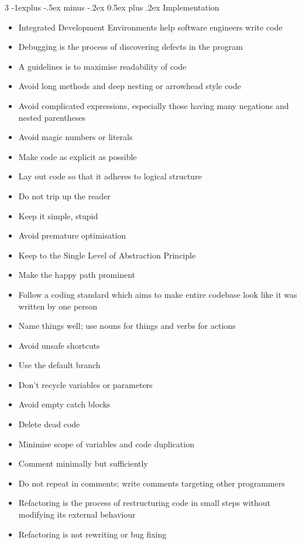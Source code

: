 \documentclass[10pt, landscape]{article}
\makeatletter
\renewcommand{\section}{\@startsection{section}{1}{0mm}%
                                {-1ex plus -.5ex minus -.2ex}%
                                {0.5ex plus .2ex}%
                                {\normalfont\large\bfseries}}
\renewcommand{\section}{\@startsection{section}{2}{0mm}%
                                {-1explus -.5ex minus -.2ex}%
                                {0.5ex plus .2ex}%
                                {\normalfont\normalsize\bfseries}}
\makeatother
\begin{document}
\begin{multicols*}{3}
\section{Implementation}
\begin{itemize}
    \item Integrated Development Environments help software engineers write code
    \item Debugging is the process of discovering defects in the program
    \item A guidelines is to maximise readability of code
    \item Avoid long methods and deep nesting or arrowhead style code
    \item Avoid complicated expressions, especially those having many negations and nested parentheses
    \item Avoid magic numbers or literals
    \item Make code as explicit as possible
    \item Lay out code so that it adheres to logical structure
    \item Do not trip up the reader
    \item Keep it simple, stupid
    \item Avoid premature optimisation
    \item Keep to the Single Level of Abstraction Principle
    \item Make the happy path prominent
    \item Follow a coding standard which aims to make entire codebase look like it was written by one person
    \item Name things well; use nouns for things and verbs for actions
    \item Avoid unsafe shortcuts
    \item Use the default branch
    \item Don't recycle variables or parameters
    \item Avoid empty catch blocks
    \item Delete dead code
    \item Minimise scope of variables and code duplication
    \item Comment minimally but sufficiently
    \item Do not repeat in comments; write comments targeting other programmers
    \item Refactoring is the process of restructuring code in small steps without modifying its external behaviour
    \item Refactoring is not rewriting or bug fixing

\end{itemize}
\end{multicols*}
\end{document}
